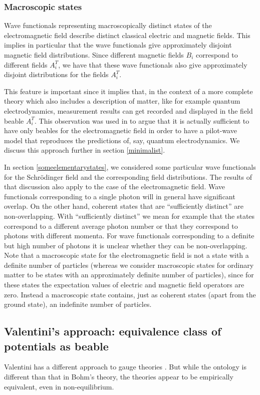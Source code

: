 \documentclass[12pt]{article}
\begin{document}
\subsubsection{Macroscopic states}
Wave functionals representing macroscopically distinct states of the electromagnetic field describe distinct classical electric and magnetic fields. This implies in particular that the wave functionals give approximately disjoint magnetic field distributions. Since different magnetic fields $B_i$ correspond to different fields $A^T_i$, we have that these wave functionals also give approximately disjoint distributions for the fields $A^T_i$.

This feature is important since it implies that, in the context of a more complete theory which also includes a description of matter, like for example quantum electrodynamics, measurement results can get recorded and displayed in the field beable $A^T_i$. This observation was used in \cite{struyve06,struyve07c} to argue that it is actually sufficient to have only beables for the electromagnetic field in order to have a pilot-wave model that reproduces the predictions of, say, quantum electrodynamics. We discuss this approach further in section \ref{minimalist}.

In section \ref{someelementarystates}, we considered some particular wave functionals for the Schr\"odinger field and the corresponding field distributions. The results of that discussion also apply to the case of the electromagnetic field. Wave functionals corresponding to a single photon will in general have significant overlap. On the other hand, coherent states that are ``sufficiently distinct'' are non-overlapping. With ``sufficiently distinct'' we mean for example that the states correspond to a different average photon number or that they correspond to photons with different momenta. For wave functionals corresponding to a definite but high number of photons it is unclear whether they can be non-overlapping. Note that a macroscopic state for the electromagnetic field is not a state with a definite number of particles (whereas we consider macroscopic states for ordinary matter to be states with an approximately definite number of particles), since for these states the expectation values of electric and magnetic field operators are zero. Instead a macroscopic state contains, just as coherent states (apart from the ground state), an indefinite number of particles.




\subsection{Valentini's approach: equivalence class of potentials as beable}\label{valentinisapproach}
Valentini has a different approach to gauge theories \cite{valentini92,valentini96,valentini09}. But while the ontology is different than that in Bohm's theory, the theories appear to be empirically equivalent, even in non-equilibrium.
\end{document}
